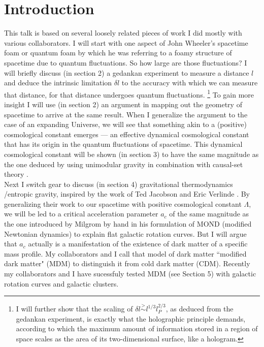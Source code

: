\documentclass[a4paper]{jpconf}
\begin{document}
\section{Introduction}

This talk is  based on several loosely related pieces of work I did 
mostly with various
collaborators.  I will start with one aspect of John Wheeler's spacetime foam 
or quantum foam by
which he was referring to a foamy structure of spacetime due to quantum 
fluctuations.  So how large
are those fluctuations?  I will briefly discuss (in section 2)
a gedankan experiment to 
measure a distance $l$ and
deduce the intrinsic limitation $\delta l$
to the accuracy with which we can measure that 
distance, \cite{ng94,ng95,Karol} for that
distance undergoes quantum fluctuations.  
\footnote{I will further show that the scaling of 
$\delta l \stackrel{>}{\sim} l^{1/3} l_P^{2/3}$, as deduced from the 
gedankan experiment, is exactly what the holographic principle 
\cite{holography,Susskind} demands, according to which the maximum 
amount of information stored in a region of space scales as the area
of its two-dimensional surface, like a hologram.\cite{ng02}}
To gain more insight I will use (in section 2) an argument 
in mapping out the geometry of spacetime \cite{llo04} to arrive
at the same result.  When I generalize the argument to the case of an 
expanding Universe, we will
see that something akin to a (positive) cosmological constant emerges  
\cite{ng08} --- an 
effective dynamical cosmological
constant that has its origin in the quantum fluctuations of spacetime.  This 
dynamical cosmological constant
will be shown \cite{PRL,ng03} (in section 3)
to have the same magnitude as the one deduced by using 
unimodular gravity \cite{Bij,ht} in
combination with causal-set theory \cite{sorkin}.\\

Next I switch gear to discuss (in section 4)
gravitational thermodynamics /entropic gravity, inspired by the work of Ted 
Jacobson \cite{Jacob95} and Eric Verlinde \cite{verlinde}.  
By generalizing their work to our spacetime with positive 
cosmological constant $\Lambda$,
we will be led to a critical acceleration parameter $a_c$ of the same 
magnitude as the one introduced by
Milgrom by hand in his formulation of MOND (modified Newtonian dynamics) to 
explain flat
galactic rotation curves.  But I will argue that $a_c$ actually is a 
manifestation of the existence of dark
matter of a specific mass profile.  My collaborators and I call that model of 
dark matter ``modified dark
matter" (MDM) to distinguish it from cold dark matter (CDM). \cite{HMN,PRD} 
Recently my collaborators
and I have sucessfuly tested MDM (see Section 5) with galactic rotation curves
and galactic clusters. \cite{Edm1}\\
\end{document}
